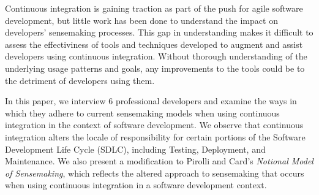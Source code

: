 \documentclass{sig-alternate}
\begin{document}
%
\author{
%
%
\alignauthor
Nicholas Nelson\\
       \\
       \\
\alignauthor
Charles Hill\\
       \\
       \\
}

\newcommand{\michael}{P1 }
\newcommand{\sruti}{P2 }
\newcommand{\caius}{P3 }
\newcommand{\srutitwo}{P4 }
\newcommand{\david}{P5 }
\newcommand{\cpg}{P6 }

\maketitle
\begin{abstract}
\end{abstract}
Continuous integration is gaining traction as part of the push for agile software development, but little work has been done to understand the impact on developers' sensemaking processes.
This gap in understanding makes it difficult to assess the effectiviness of tools and techniques developed to augment and assist developers using continuous integration. Without thorough understanding of the underlying usage patterns and goals, any improvements to the tools could be to the detriment of developers using them.

 In this paper, we interview 6 professional developers and examine the ways in which they adhere to current sensemaking models when using continuous integration in the context of software development. We observe that continuous integration alters the locale of responsibility for certain portions of the Software Development Life Cycle (SDLC)\cite{singh:lifecycle}, including Testing, Deployment, and Maintenance. We also present a modification to Pirolli and Card's \textit{Notional Model of Sensemaking}\cite{pirolli:sensemaking}, which reflects the altered approach to sensemaking that occurs when using continuous integration in a software development context.
\smallskip
\end{document}
